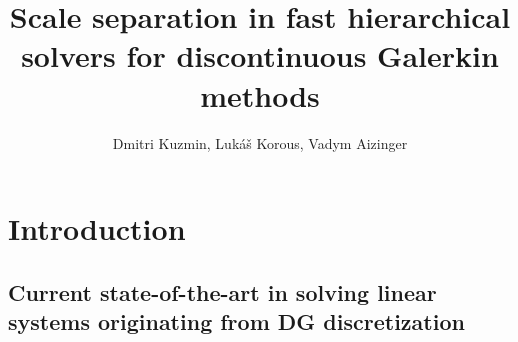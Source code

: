 \documentclass[mathserif]{beamer}
\title{Scale separation in fast hierarchical solvers for discontinuous Galerkin methods}
\author[\underline{D. Kuzmin}, L. Korous, V. Aizinger]{Dmitri Kuzmin, Luk\' a\v s Korous, Vadym Aizinger}
\institute[Erlangen, Pilsen]{University Erlangen-N\"urnberg, University of West Bohemia}
\begin{document}
\newcommand{\bs}[1]{\LARGE \textit{\textbf{#1}}}

\newcommand{\D}{\mathrm{d}}
\newcommand{\pd}[2]{\frac{\partial #1}{\partial #2}}
\newcommand{\msc}[1]{\mbox{\sc #1}}
\newcommand{\mschat}[1]{\hat{\mbox{\sc #1}}}
\newcommand{\mbf}[1]{\mbox{\small$\mathbf{#1}$}}
\newcommand{\mbfhat}[1]{\mbox{\small$\hat{\mathbf{#1}}$}}
\newcommand{\dx}{\,\mathrm{d}\mathbf{x}}
\newcommand{\ds}{\,\mathrm{d}s}
\newcommand{\be}{\begin{equation}}
\newcommand{\ee}{\end{equation}}
\newcommand{\bea}{\begin{eqnarray}}
\newcommand{\eea}{\end{eqnarray}}
\newcommand{\bn}{\mathbf{n}}
\newcommand{\bx}{\mathbf{x}}
\newcommand{\ba}{\mathbf{a}}
\newcommand{\bv}{\mathbf{v}}
\newcommand{\bu}{\mathbf{u}}
\newcommand{\bb}{\mathbf{b}}
\newcommand{\ff}{\mathbf{f}}
\newcommand{\p}{\partial}


\newcommand{\td}[2]{\frac{\D #1}{\D #2}}

\newcommand{\jump}[1]{[\![#1]\!]}


\begin{frame}
\large
\titlepage
\end{frame}

\section{Introduction}
\subsection{Current state-of-the-art in solving linear systems originating from DG discretization}
\end{document}
